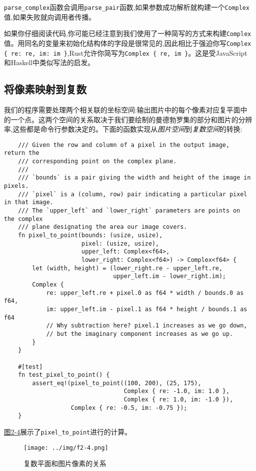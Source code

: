 \texttt{parse\_complex}函数会调用\texttt{parse\_pair}函数,如果参数成功解析就构建一个\texttt{Complex}值,如果失败就向调用者传播。

如果你仔细阅读代码,你可能已经注意到我们使用了一种简写的方式来构建\texttt{Complex}值。用同名的变量来初始化结构体的字段是很常见的,因此相比于强迫你写\texttt{Complex \{ re: re, im: im \}},Rust允许你简写为\texttt{Complex \{ re, im \}}。这是受JavaScript和Haskell中类似写法的启发。

\subsection{将像素映射到复数}
我们的程序需要处理两个相关联的坐标空间:输出图片中的每个像素对应复平面中的一个点。这两个空间的关系取决于我们要绘制的曼德勃罗集的部分和图片的分辨率,这些都是命令行参数决定的。下面的函数实现从\emph{图片空间}到\emph{复数空间}的转换:
\begin{verbatim}
    /// Given the row and column of a pixel in the output image, return the
    /// corresponding point on the complex plane.
    ///
    /// `bounds` is a pair giving the width and height of the image in pixels.
    /// `pixel` is a (column, row) pair indicating a particular pixel in that image.
    /// The `upper_left` and `lower_right` parameters are points on the complex
    /// plane designating the area our image covers.
    fn pixel_to_point(bounds: (usize, usize),
                      pixel: (usize, usize),
                      upper_left: Complex<f64>,
                      lower_right: Complex<f64>) -> Complex<f64> {
        let (width, height) = (lower_right.re - upper_left.re,
                               upper_left.im - lower_right.im);
        Complex {
            re: upper_left.re + pixel.0 as f64 * width / bounds.0 as f64,
            im: upper_left.im - pixel.1 as f64 * height / bounds.1 as f64
            // Why subtraction here? pixel.1 increases as we go down,
            // but the imaginary component increases as we go up.
        }
    }

    #[test]
    fn test_pixel_to_point() {
        assert_eq!(pixel_to_point((100, 200), (25, 175),
                                  Complex { re: -1.0, im: 1.0 },
                                  Complex { re: 1.0, im: -1.0 }),
                   Complex { re: -0.5, im: -0.75 });
    }
\end{verbatim}

\hyperref[f2-4]{图2-4}展示了\texttt{pixel\_to\_point}进行的计算。

\begin{figure}[htbp]
    \centering
    \texttt{[image: ../img/f2-4.png]}
    \caption{复数平面和图片像素的关系}
    \label{f2-4}
\end{figure}

